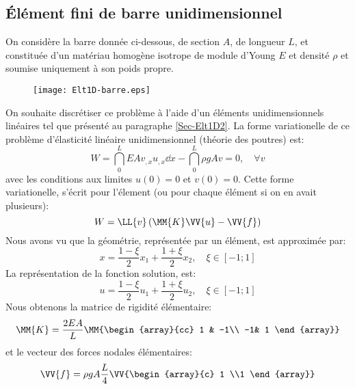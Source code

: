    \subsection{Élément fini de barre unidimensionnel}\label{Sec-barre1D}
\fi
On considère la barre donnée ci-dessous, de section $A$, de longueur $L$, et constituée 
d'un matériau homogène isotrope de module d'Young 
$E$ et densité $\rho$ et soumise uniquement à son poids propre.\\
\begin{figure}[ht]
\centering
\texttt{[image: Elt1D-barre.eps]}
\end{figure}
On souhaite discrétiser ce problème à l'aide d'un éléments unidimensionnels linéaires
tel que présenté au paragraphe \ref{Sec-Elt1D2}.
\medskipvm
La forme variationelle de ce problème d'élasticité linéaire unidimensionnel (théorie des poutres) est:
\begin{equation}
W=\dint_0^L EA v_{,x}u_{,x} \dd x - \dint_0^L \rho g A v = 0, \quad \forall v
\end{equation}
avec les conditions aux limites $u(0)=0$ et $v(0)=0$.
Cette forme variationelle, s'écrit pour l'élement (ou pour chaque élément si on en avait plusieurs):
\begin{equation}
W = \LL{v} \left( \MM{K}\VV{u} - \VV{f} \right)
\end{equation}
\medskipvm
Nous avons vu que la géométrie, représentée par un élément, est approximée par:
\begin{equation} x=\frac{1-\xi}2 x_1 + \frac{1+\xi}2 x_2, \quad \xi\in[-1;1] \end{equation}
La représentation de la fonction solution, est:
\begin{equation} u = \frac{1-\xi}2 u_1 + \frac{1+\xi}2 u_2, \quad \xi\in[-1;1] \end{equation}
\medskipvm
Nous obtenons la matrice de rigidité élémentaire:
\begin{equation} 
\MM{K} = \frac{2EA}L \MM{\begin{array}{cc} 1 & -1\\ -1& 1 \end{array}}
\end{equation}
et le vecteur des forces nodales élémentaires:
\begin{equation}  
\VV{f} = \rho g A \frac{L}4 \VV{\begin{array}{c} 1 \\1 \end{array}}
\end{equation}
